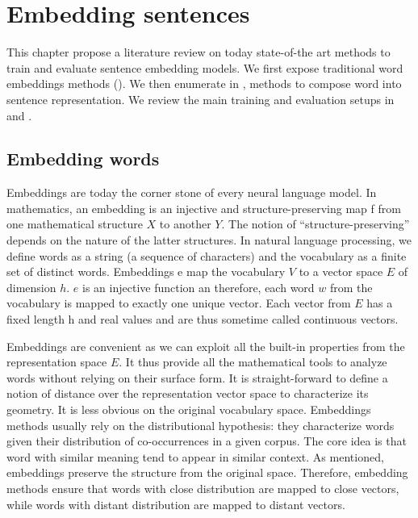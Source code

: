 \setchapterpreamble[u]{\margintoc}
\chapter{Embedding sentences}


This chapter propose a literature review on today state-of-the art methods to train and evaluate sentence embedding models. We first expose traditional word embeddings methods (). We then enumerate in , methods to compose word into sentence representation. We review the main training and evaluation setups in  and .

\section{Embedding words}

Embeddings are today the corner stone of every neural language model. In mathematics, an embedding is an injective and structure-preserving map f from one mathematical structure $X$ to another $Y$. The notion of “structure-preserving” depends on the nature of the latter structures. In natural language processing, we define words as a string (a sequence of characters) and the vocabulary as a finite set of distinct words. Embeddings e map the vocabulary $V$ to a vector space $E$ of dimension $h$. $e$ is an injective function an therefore, each word $w$ from the vocabulary is mapped to exactly one unique vector. Each vector from $E$ has a fixed length h and real values and are thus sometime called continuous vectors. 

Embeddings are convenient as we can exploit all the built-in properties from the representation space $E$. It thus provide all the mathematical tools to analyze words without relying on their surface form. It is straight-forward to define a notion of distance over the representation vector space to characterize its geometry. It is less obvious on the original vocabulary space. Embeddings methods usually rely on the distributional hypothesis: they characterize words given their distribution of co-occurrences in a given corpus. The core idea is that word with similar meaning tend to appear in similar context. As mentioned, embeddings preserve the structure from the original space. Therefore, embedding methods ensure that words with close distribution are mapped to close vectors, while words with distant distribution are mapped to distant vectors.

